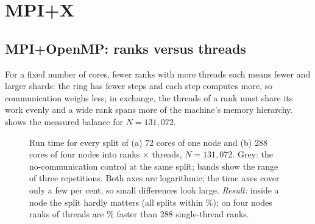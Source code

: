 \section{MPI+X}\label{sec:mpix}

\subsection{MPI+OpenMP: ranks versus threads}\label{sec:hybrid}
For a fixed number of cores, fewer ranks with more threads each means fewer and
larger shards: the ring has fewer steps and each step computes more, so communication
weighs less; in exchange, the threads of a rank must share its work evenly and a wide
rank spans more of the machine's memory hierarchy.  shows the
measured balance for $N=131{,}072$.

\begin{figure}[t]
\centering
{}
\caption{Run time for every split of (a) 72 cores of one node and (b) 288 cores of
four nodes into ranks $\times$ threads, $N=131{,}072$. Grey: the no-communication
control at the same split; bands show the range of three repetitions. Both axes
are logarithmic; the time axes cover only a few per cent, so small differences
look large. \emph{Result:} inside a node the split hardly matters (all splits within
\%); on four nodes  ranks of
 threads are \% faster than 288
single-thread ranks.}
\label{fig:hybrid}
\end{figure}

